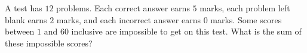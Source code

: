 A test has $12$ problems. Each correct answer earns $5$ marks, each problem left blank earns $2$ marks, and each incorrect answer earns $0$ marks. Some scores between $1$ and $60$ inclusive are impossible to get on this test. What is the sum of these impossible scores?
